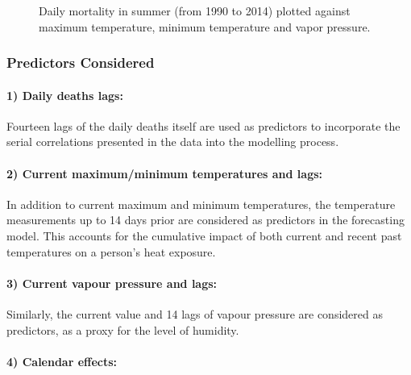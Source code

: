 \documentclass[
  11pt,
  a4paper,
]{article}
\begin{document}
\begin{figure}


\caption{\label{fig-Tmax}Daily mortality in summer (from 1990 to 2014)
plotted against maximum temperature, minimum temperature and vapor
pressure.}

\end{figure}%

\pagebreak[3]

\subsubsection{Predictors Considered}\label{predictors-considered}

\paragraph{1) Daily deaths lags:}\label{daily-deaths-lags}

Fourteen lags of the daily deaths itself are used as predictors to
incorporate the serial correlations presented in the data into the
modelling process.

\paragraph{2) Current maximum/minimum temperatures and
lags:}\label{current-maximumminimum-temperatures-and-lags}

In addition to current maximum and minimum temperatures, the temperature
measurements up to 14 days prior are considered as predictors in the
forecasting model. This accounts for the cumulative impact of both
current and recent past temperatures on a person's heat exposure.

\paragraph{3) Current vapour pressure and
lags:}\label{current-vapour-pressure-and-lags}

Similarly, the current value and 14 lags of vapour pressure are
considered as predictors, as a proxy for the level of humidity.

\paragraph{4) Calendar effects:}\label{calendar-effects}
\end{document}
